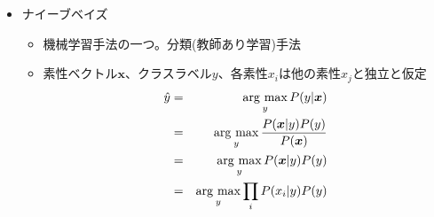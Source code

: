 \documentclass[a4j,11pt]{jsarticle}
\newcommand{\argmax}{\mathop{\rm arg~max}\limits}
\begin{document}
\begin{itemize}
\begin{itemize}
       \end{itemize}
 \item ナイーブベイズ
       \begin{itemize}
	\item 機械学習手法の一つ。分類(教師あり学習)手法
	\item 素性ベクトル$\bm{x}$、クラスラベル$y$、各素性$x_i$は他の素性$x_j$と独立と仮定
	      \begin{eqnarray*}
	       \hat{y} &=& \argmax_{y} P(y|\bm{x}) \\
	       &=& \argmax_{y}
		\frac{P(\bm{x}|y)P(y)}{P(\bm{x})} \\
	       &=& \argmax_{y}P(\bm{x}|y)P(y) \\
	       &=& \argmax_{y} \prod_i{P(x_i|y)P(y)}
	      \end{eqnarray*}
       \end{itemize}
\end{itemize}
\end{document}
